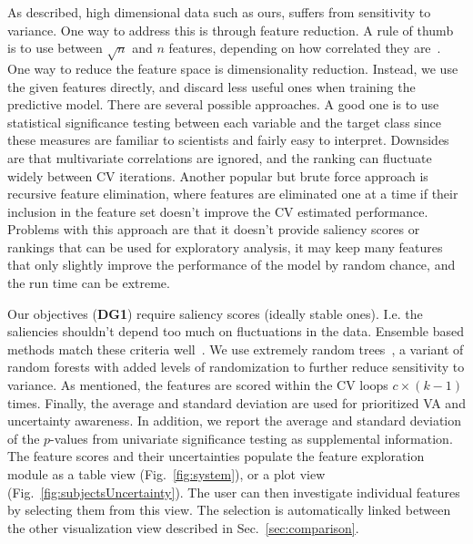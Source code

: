 \noindent As described, high dimensional data such as ours, suffers from sensitivity to variance. One way to address this is through feature reduction. A rule of thumb is to use between $\sqrt{n}$ and $n$ features, depending on how correlated they are~\cite{hua2004optimal}. One way to reduce the feature space is dimensionality reduction. %
Instead, we use the given features directly, and discard less useful ones when training the predictive model. There are several possible approaches. A good one is to use statistical significance testing between each variable and the target class since these measures are familiar to scientists and fairly easy to interpret.  Downsides are that multivariate correlations are ignored, and the ranking can fluctuate widely between CV iterations. Another popular but brute force approach is recursive feature elimination, where features are eliminated one at a time if their inclusion in the feature set doesn't improve the CV estimated performance. Problems with this approach are that it doesn't provide saliency scores or rankings that can be used for exploratory analysis, it may keep many features that only slightly improve the performance of the model by random chance, and the run time can be extreme. 

Our objectives (\textbf{DG1}) require saliency scores (ideally stable ones). I.e. the saliencies shouldn't depend too much on fluctuations in the data. Ensemble based methods match these criteria well~\cite{saeys2008robust}. We use extremely random trees~\cite{geurts2006extremely}, a variant of random forests with added levels of randomization to further reduce sensitivity to variance. As mentioned, the features are scored within the CV loops $c\times(k-1)$ times. Finally, the average and standard deviation are used for prioritized VA and uncertainty awareness. In addition, we report the average and standard deviation of the $p$-values from univariate significance testing as supplemental information. The feature scores and their uncertainties populate the feature exploration module as a table view (Fig.~\ref{fig:system}), or a plot view (Fig.~\ref{fig:subjectsUncertainty}). The user can then investigate individual features by selecting them from this view. The selection is automatically linked between the other visualization view described in Sec.~\ref{sec:comparison}. 



